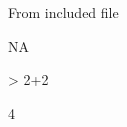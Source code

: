 \usepackage[utf8]{inputenc} %

From included file

NA

\begin{Schunk}
\begin{Sinput}
> 2+2
\end{Sinput}
\begin{Soutput}
[1] 4
\end{Soutput}
\end{Schunk}
